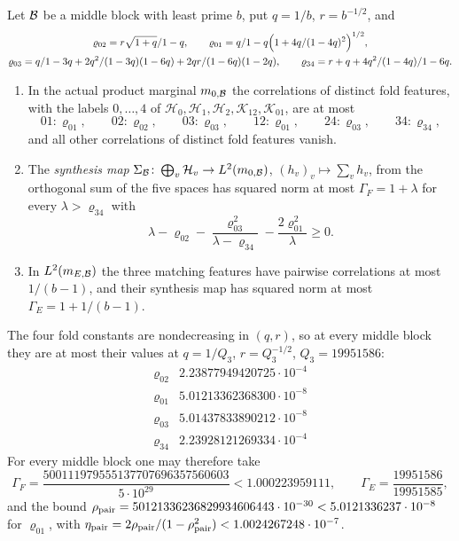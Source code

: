 \begin{lemma}\label{lem:oct24:feature-block}
Let $\Blk$ be a middle block with least prime $b$, put $q=1/b$, $r=b^{-1/2}$, and
\begin{gather*}
 \varrho_{02}=\frac{r\sqrt{1+q}}{1-q},\qquad
 \varrho_{01}=\frac q{1-q}\Bigl(1+\frac{4q}{(1-4q)^2}\Bigr)^{1/2},\\
 \varrho_{03}=\frac q{1-3q}+\frac{2q^2}{(1-3q)(1-6q)}+\frac{2qr}{(1-6q)(1-2q)},
 \qquad
 \varrho_{34}=\frac{r+q+4q^2/(1-4q)}{1-6q}.
\end{gather*}
\begin{enumerate}[label=(\alph*)]
\item In the actual product marginal $m_{0,\Blk}$ the correlations of distinct
 fold features, with the labels $0,\dots,4$ of $\mathcal H_0,\mathcal H_1,\mathcal H_2,
 \mathcal K_{12},\mathcal K_{01}$, are at most
 \[
  01:\varrho_{01},\qquad02:\varrho_{02},\qquad03:\varrho_{03},\qquad
  12:\varrho_{01},\qquad24:\varrho_{03},\qquad34:\varrho_{34},
 \]
 and all other correlations of distinct fold features vanish.
\item The \emph{synthesis map} $\Sigma_\Blk\colon\bigoplus_v\mathcal H_v\to L^2(m_{0,\Blk})$,
 $(h_v)_v\mapsto\sum_vh_v$, from the orthogonal sum of the five spaces has squared
 norm at most $\Gamma_F=1+\lambda$ for every $\lambda>\varrho_{34}$ with
 \begin{equation}\label{eq:feature-perron}
  \lambda-\varrho_{02}-\frac{\varrho_{03}^2}{\lambda-\varrho_{34}}
  -\frac{2\varrho_{01}^2}\lambda\ge0 .
 \end{equation}
\item In $L^2(m_{E,\Blk})$ the three matching features have pairwise correlations
 at most $1/(b-1)$, and their synthesis map has squared norm at most
 $\Gamma_E=1+1/(b-1)$.
\end{enumerate}
The four fold constants are nondecreasing in $(q,r)$, so at every middle block
they are at most their values at $q=1/Q_3$, $r=Q_3^{-1/2}$, $Q_3=19951586$:
\[
\begin{array}{c|l}
 \varrho_{02}&2.23877949420725\cdot10^{-4}\\
 \varrho_{01}&5.01213362368300\cdot10^{-8}\\
 \varrho_{03}&5.01437833890212\cdot10^{-8}\\
 \varrho_{34}&2.23928121269334\cdot10^{-4}
\end{array}
\]
For every middle block one may therefore take
\begin{equation}\label{eq:oct24:feature-constants}
 \Gamma_F=\frac{500111979555137707696357560603}{5\cdot10^{29}}<1.000223959111,
 \qquad
 \Gamma_E=\frac{19951586}{19951585},
\end{equation}
and the bound $\rho_{\rm pair}=50121336236829934606443\cdot10^{-30}<5.0121336237\cdot10^{-8}$
for $\varrho_{01}$, with $\eta_{\rm pair}=2\rho_{\rm pair}/(1-\rho_{\rm pair}^2)<1.0024267248\cdot10^{-7}$.
\end{lemma}

